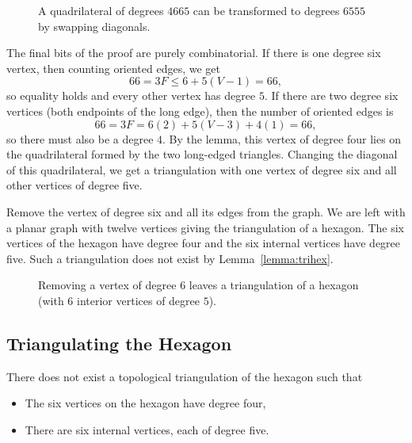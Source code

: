 \begin{figure}[htb]
  \centering
  \caption{A quadrilateral of degrees $4665$ can
be transformed to degrees $6555$ by swapping
diagonals.}
  \label{fig:13:D}
\end{figure}

The final bits of the proof are purely combinatorial. If there is
one degree six vertex, then counting oriented edges, we get
    $$66 = 3 F \le 6 + 5(V-1) = 66,$$
so equality holds and every other vertex has degree $5$.  If there
are two degree six vertices (both endpoints of the long edge),
then the number of oriented edges is
    $$
    66 = 3 F = 6 (2) + 5 (V-3) + 4 (1) = 66,
    $$
so there must also be a degree $4$.  By the lemma, this vertex of
degree four lies on the quadrilateral formed by the two long-edged
triangles.  Changing the diagonal of this quadrilateral, we get a
triangulation with one vertex of degree six and all other vertices
of degree five.

Remove the vertex of degree six and all its edges from the graph.
We are left with a planar graph with twelve vertices giving the
triangulation of a hexagon.  The six vertices of the hexagon have
degree four and the six internal vertices have degree five.  Such
a triangulation does not exist by Lemma~\ref{lemma:trihex}.

\begin{figure}[htb]
  \centering
  \caption{Removing a vertex of degree $6$ leaves a
triangulation of a hexagon (with $6$ interior vertices of degree
$5$).}
  \label{fig:13:E}
\end{figure}

\subsection{Triangulating the Hexagon}

\begin{lemma}\label{lemma:trihex}  
There does not exist a topological triangulation of the hexagon such that
    \begin{itemize}
     \item   The six vertices on the hexagon have degree four,
     \item   There are six internal vertices, each of degree five.
    \end{itemize}
\end{lemma}

